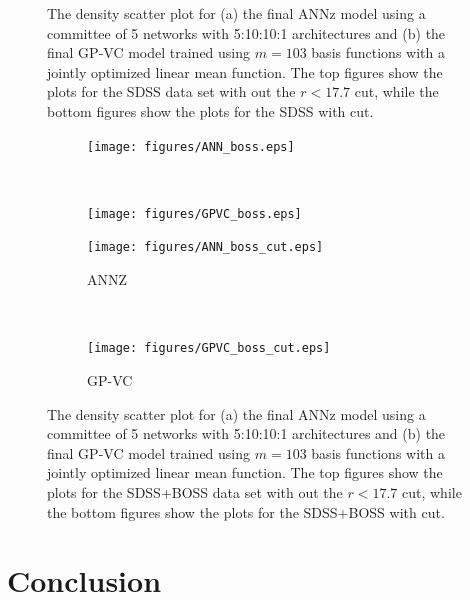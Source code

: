 \documentclass[useAMS,usenatbib,fleqn]{mn2e}
\begin{document}
\begin{figure}
        
       \caption{The density scatter plot for (a) the final {\sc ANNz} model using a committee of 5 networks with 5:10:10:1 architectures and (b) the final GP-VC model trained using $m=103$ basis functions with a jointly optimized linear mean function. The top figures show the plots for the SDSS data set with out the $r<17.7$ cut, while the bottom figures show the plots for the SDSS with cut.}
       \label{fig-final-model-sdss}
\end{figure}

\begin{figure}
        \centering
       

        \begin{subfigure}[b]{0.35\textwidth}
                \texttt{[image: figures/ANN\_boss.eps]}
        \end{subfigure}
        ~ 
        \begin{subfigure}[b]{0.35\textwidth}
                \texttt{[image: figures/GPVC\_boss.eps]}
        \end{subfigure}
        

        \begin{subfigure}[b]{0.35\textwidth}
                \texttt{[image: figures/ANN\_boss\_cut.eps]}
        \caption{{\sc ANNZ}}
        \end{subfigure}
        ~ 
        \begin{subfigure}[b]{0.35\textwidth}
                \texttt{[image: figures/GPVC\_boss\_cut.eps]}
        \caption{GP-VC}
        \end{subfigure}
        
       \caption{The density scatter plot for (a) the final {\sc ANNz} model using a committee of 5 networks with 5:10:10:1 architectures and (b) the final GP-VC model trained using $m=103$ basis functions with a jointly optimized linear mean function. The top figures show the plots for the SDSS+BOSS data set with out the $r<17.7$ cut, while the bottom figures show the plots for the SDSS+BOSS with cut. }
       \label{fig-final-model-boss}
\end{figure}

\section{Conclusion}
\label{sec-conclusion}
\end{document}
